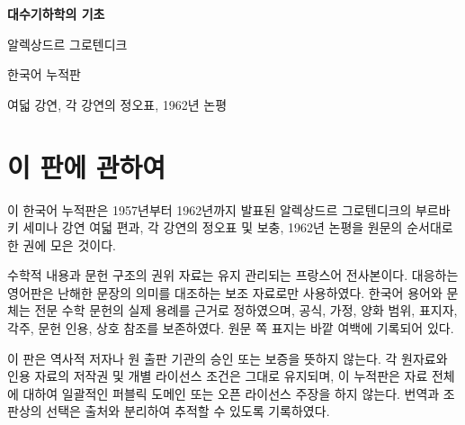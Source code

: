 \begin{titlepage}
  \centering
  \vspace*{0.16\textheight}
  {\Huge\bfseries 대수기하학의 기초\par}
  \vspace{1.2\baselineskip}
  {\Large 알렉상드르 그로텐디크\par}
  \vfill
  {\large 한국어 누적판\par}
  \vspace{0.5\baselineskip}
  {\normalsize 여덟 강연, 각 강연의 정오표, 1962년 논평\par}
\end{titlepage}

\chapter*{이 판에 관하여}

이 한국어 누적판은 1957년부터 1962년까지 발표된 알렉상드르
그로텐디크의 부르바키 세미나 강연 여덟 편과, 각 강연의 정오표 및
보충, 1962년 논평을 원문의 순서대로 한 권에 모은 것이다.

수학적 내용과 문헌 구조의 권위 자료는 유지 관리되는 프랑스어
전사본이다. 대응하는 영어판은 난해한 문장의 의미를 대조하는 보조
자료로만 사용하였다. 한국어 용어와 문체는 전문 수학 문헌의 실제
용례를 근거로 정하였으며, 공식, 가정, 양화 범위, 표지자, 각주,
문헌 인용, 상호 참조를 보존하였다. 원문 쪽 표지는 바깥 여백에
기록되어 있다.

이 판은 역사적 저자나 원 출판 기관의 승인 또는 보증을 뜻하지 않는다.
각 원자료와 인용 자료의 저작권 및 개별 라이선스 조건은 그대로
유지되며, 이 누적판은 자료 전체에 대하여 일괄적인 퍼블릭 도메인 또는
오픈 라이선스 주장을 하지 않는다. 번역과 조판상의 선택은 출처와
분리하여 추적할 수 있도록 기록하였다.

\clearpage
